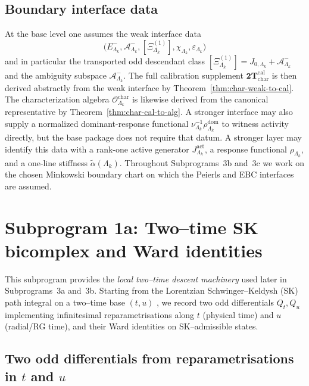 \subsection{Boundary interface data}
At the base level one assumes the weak interface data
\[
\bigl(E^-_{\Lambda_k},\mathcal A^-_{\Lambda_k},[\Xi^{(1)}_{\Lambda_k}],\chi_{\Lambda_k},\varepsilon_{\Lambda_k}\bigr)
\]
and in particular the transported odd descendant class
\(
[\Xi^{(1)}_{\Lambda_k}]
=
J_{0,\Lambda_k}+\mathcal A^-_{\Lambda_k}
\)
and the ambiguity subspace \(\mathcal A^-_{\Lambda_k}\).
The full calibration supplement \(\mathbf{2T}_{\mathrm{char}}^{\mathrm{cal}}\) is then
derived abstractly from the weak interface by
Theorem~\ref{thm:char-weak-to-cal}. The characterization algebra
\(\mathcal O^{\mathrm{char}}_{\Lambda_k}\) is likewise derived from the canonical
representative by Theorem~\ref{thm:char-cal-to-alg}.
A stronger interface may also supply a normalized dominant-response functional
\(
\nu_{\Lambda_k}^{-1}\rho^{\mathrm{dom}}_{\Lambda_k}
\)
to witness activity directly, but the base package does not require that datum.
A stronger layer may identify this data with a rank-one active generator
\(J^{\mathrm{act}}_{\Lambda_k}\), a response functional \(\rho_{\Lambda_k}\), and a one-line
stiffness \(\widetilde\alpha(\Lambda_k)\).
Throughout Subprograms~3b and~3c we work on the chosen Minkowski boundary chart on
which the Peierls and EBC interfaces are assumed.

\section{Subprogram 1a: Two--time SK bicomplex and Ward identities}
\label{sec:subprogram1a}

This subprogram provides the \emph{local two--time descent machinery} used later
in Subprograms~3a and~3b.  Starting from the Lorentzian Schwinger--Keldysh (SK) path
integral on a two--time base $(t,u)$ \cite{Schwinger1961,Keldysh1964}, we record
two odd differentials $Q_t,Q_u$ implementing infinitesimal reparametrisations
along $t$ (physical time) and $u$ (radial/RG time), and their Ward identities on
SK--admissible states.

\subsection{Two odd differentials from reparametrisations in $t$ and $u$}
\label{subsec:two-BRST}

